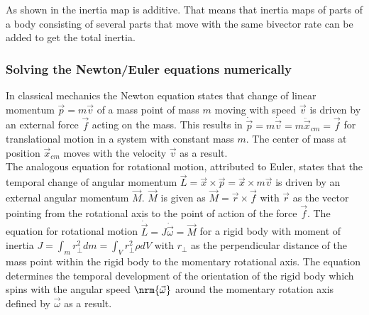 As shown in \cite{Dynamics_in_PGA_plane-based_Dorst-DeKennik:2023} the inertia map is
additive. That means that inertia maps of parts of a body consisting of several parts that
move with the same bivector rate can be added to get the total inertia. \\


\subsubsection{Solving the Newton/Euler equations numerically}
\label{subsubsection_solving_newton-euler_numerically}

In classical mechanics the Newton equation states that change of linear momentum $\vec{p}
= m \vec{v}$ of a mass point of mass $m$ moving with speed $\vec{v}$ is driven by an
external force $\vec{f}$ acting on the mass. This results in $\dot{\vec{p}} = m
\dot{\vec{v}} = m \ddot{\vec{x}}_{cm} = \vec{f}$ for translational motion in a system with
constant mass $m$. The center of mass at position $\vec{x}_{cm}$ moves with the velocity
$\vec{v}$ as a result. \\

The analogous equation for rotational motion, attributed to Euler, states that the
temporal change of angular momentum $\vec{L} = \vec{x} \times \vec{p} = \vec{x} \times m
\vec{v}$ is driven by an external angular momentum $\vec{M}$. $\vec{M}$ is given as
$\vec{M} = \vec{r} \times \vec{f}$ with $\vec{r}$ as the vector pointing from the
rotational axis to the point of action of the force $\vec{f}$. The equation for rotational
motion $\dot{\vec{L}} = J \dot{\vec{\omega}} = \vec{M}$ for a rigid body with moment of
inertia $J = \int_{m}{r^2_\perp dm} = \int_{V}{r^2_\perp \rho dV}$ with $r_\perp$ as the
perpendicular distance of the mass point within the rigid body to the momentary rotational
axis. The equation determines the temporal development of the orientation of the rigid
body which spins with the angular speed $\nrm{\vec{\omega}}$ around the momentary rotation
axis defined by $\vec{\omega}$  as a result. \\

